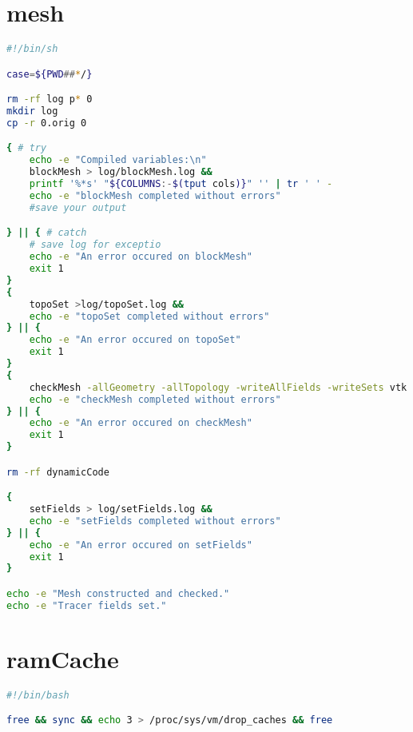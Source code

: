 \section{mesh}
\begin{lstlisting}[language=bash]
#!/bin/sh

case=${PWD##*/}

rm -rf log p* 0
mkdir log
cp -r 0.orig 0

{ # try
	echo -e "Compiled variables:\n"
    blockMesh > log/blockMesh.log &&
    printf '%*s' "${COLUMNS:-$(tput cols)}" '' | tr ' ' -
    echo -e "blockMesh completed without errors"
    #save your output

} || { # catch
    # save log for exceptio
    echo -e "An error occured on blockMesh"
    exit 1 
}
{
    topoSet >log/topoSet.log &&
    echo -e "topoSet completed without errors"
} || {
    echo -e "An error occured on topoSet"
    exit 1 
}
{
    checkMesh -allGeometry -allTopology -writeAllFields -writeSets vtk > log/checkMesh.log &&
    echo -e "checkMesh completed without errors"
} || {
    echo -e "An error occured on checkMesh"
    exit 1 
}

rm -rf dynamicCode

{
    setFields > log/setFields.log &&
    echo -e "setFields completed without errors"
} || {
    echo -e "An error occured on setFields"
    exit 1 
}

echo -e "Mesh constructed and checked."
echo -e "Tracer fields set."

\end{lstlisting}

\section{ramCache}
\begin{lstlisting}[language=bash]
#!/bin/bash

free && sync && echo 3 > /proc/sys/vm/drop_caches && free

\end{lstlisting}

